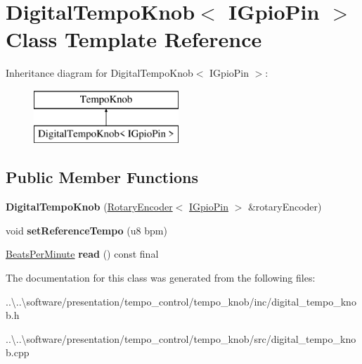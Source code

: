 \hypertarget{class_digital_tempo_knob}{}\section{Digital\+Tempo\+Knob$<$ I\+Gpio\+Pin $>$ Class Template Reference}
\label{class_digital_tempo_knob}
Inheritance diagram for Digital\+Tempo\+Knob$<$ I\+Gpio\+Pin $>$\+:\begin{figure}[H]
\begin{center}
\leavevmode
\includegraphics[height=2.000000cm]{class_digital_tempo_knob}
\end{center}
\end{figure}
\subsection*{Public Member Functions}
\begin{DoxyCompactItemize}
\item 
\mbox{\label{class_digital_tempo_knob_a7a0c8f6a062484a035b37148beb591db}} 
{\bfseries Digital\+Tempo\+Knob} (\mbox{\hyperlink{class_rotary_encoder}{Rotary\+Encoder}}$<$ \mbox{\hyperlink{class_i_gpio_pin}{I\+Gpio\+Pin}} $>$ \&rotary\+Encoder)
\item 
\mbox{\label{class_digital_tempo_knob_a3de50e157858cf898fd6c302575d06f7}} 
void {\bfseries set\+Reference\+Tempo} (u8 bpm)
\item 
\mbox{\label{class_digital_tempo_knob_a3ab91bdef9c4f23e5b30e2dbb80500b3}} 
\mbox{\hyperlink{class_beats_per_minute}{Beats\+Per\+Minute}} {\bfseries read} () const final
\end{DoxyCompactItemize}


The documentation for this class was generated from the following files\+:\begin{DoxyCompactItemize}
\item 
..\textbackslash{}..\textbackslash{}software/presentation/tempo\+\_\+control/tempo\+\_\+knob/inc/digital\+\_\+tempo\+\_\+knob.\+h\item 
..\textbackslash{}..\textbackslash{}software/presentation/tempo\+\_\+control/tempo\+\_\+knob/src/digital\+\_\+tempo\+\_\+knob.\+cpp\end{DoxyCompactItemize}
